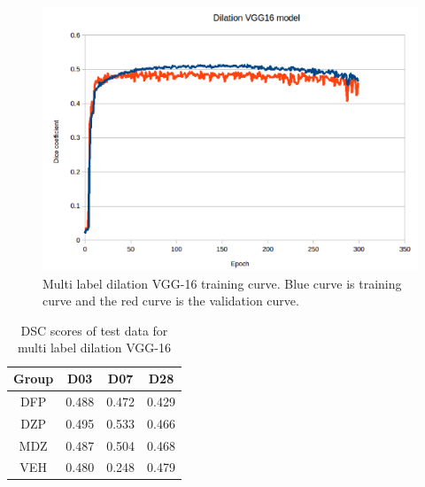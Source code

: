 \begin{figure}[!tbh]
\centering
\includegraphics[width=\textwidth]{results/train_results_multi_dilation.png}
\caption{Multi label dilation VGG-16 training curve. Blue curve is training curve and the red curve is the validation curve. }
\label{fig:results_multi_dilation_train}
\end{figure}

\begin{table}[tbh]
\renewcommand{\arraystretch}{1}
\centering
\begin{tabular}{|c|c|c|c|}
\hline
\textbf{Group} & \textbf{D03}& \textbf{D07}& \textbf{D28}\\
\hline
DFP & 0.488 & 0.472 & 0.429\\      
\hline
DZP & 0.495 & 0.533 & 0.466\\
\hline
MDZ & 0.487 & 0.504 & 0.468\\ 
\hline
VEH & 0.480 & 0.248 & 0.479\\ 
\hline
\end{tabular}
\caption{DSC scores of test data for multi label dilation VGG-16}
\label{tab.multi_model_results_dilation}
\end{table}


